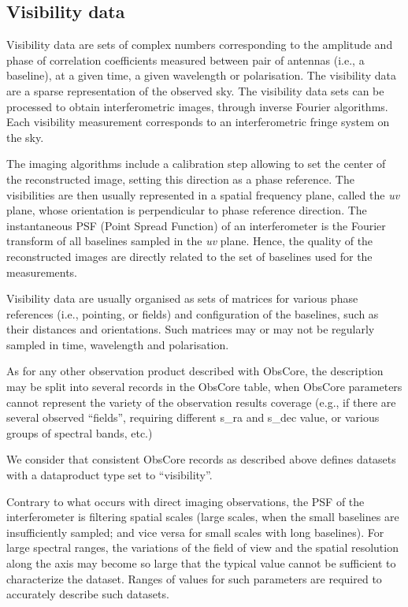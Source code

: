 \documentclass[11pt,a4paper]{ivoa}
\begin{document}
\subsection{Visibility data }
\label{sec:visibility}

Visibility data are sets of complex numbers corresponding to the amplitude and phase 
of correlation coefficients measured between pair of antennas (i.e., a baseline), at 
a given time, a given wavelength or polarisation. The visibility data are a sparse 
representation of the observed sky. The visibility data sets can be processed to obtain 
interferometric images, through inverse Fourier algorithms. Each visibility measurement 
corresponds to an interferometric fringe system on the sky. 

The imaging algorithms include a calibration step allowing to set the center of the 
reconstructed image, setting this direction as a phase reference. The visibilities
are then usually represented in a spatial frequency plane, called the \emph{uv} plane, 
whose orientation is perpendicular to phase reference direction. The instantaneous PSF 
(Point Spread Function) of an interferometer is the Fourier transform of all baselines 
sampled in the \emph{uv} plane. Hence, the quality of the reconstructed images are 
directly related to the set of baselines used for the measurements.

Visibility data are usually organised as sets of matrices for various phase references
(i.e., pointing, or fields) and configuration of the baselines, such as their
distances and orientations. Such matrices may or may not be regularly sampled in time, 
wavelength and polarisation.
    
As for any other observation product described with ObsCore, the description may be split into
several records in the ObsCore table, when ObsCore parameters cannot represent the 
variety of the observation results coverage (e.g., if there are several observed ``fields'', 
requiring different s\_ra and s\_dec value, or various groups of spectral bands, etc.) 

We consider that consistent ObsCore records as described above defines datasets with 
a dataproduct type set to ``visibility''.


Contrary to what occurs with direct imaging observations, the PSF of the interferometer
is filtering spatial scales (large scales, when the small baselines are insufficiently 
sampled; and vice versa for small scales with long baselines).
For large spectral ranges, the variations of the field of view and the spatial resolution 
along the axis may become so large that the typical value cannot be sufficient to 
characterize the dataset. Ranges of values for such parameters are required to accurately 
describe such datasets.
\end{document}
